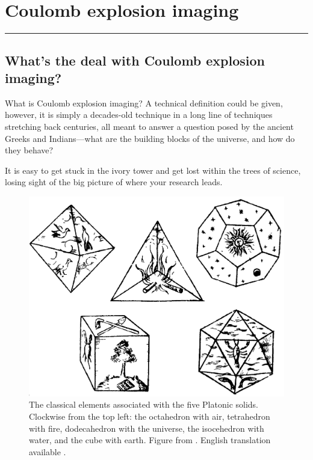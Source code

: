\chapter{Coulomb explosion imaging}\label{ch:CEI}

\vspace{-1.5 em}
\begin{addmargin}[-0.5cm]{0cm}
  \minitoc
\end{addmargin}
\hrule
\vspace{1.5 em}

\section{What's the deal with Coulomb explosion imaging?}
What is Coulomb explosion imaging? A technical definition could be given, however, it is simply a decades-old technique in a long line of techniques stretching back centuries, all meant to answer a question posed by the ancient Greeks and Indians---what are the building blocks of the universe, and how do they behave?

It is easy to get stuck in the ivory tower and get lost within the trees of science, losing sight of the big picture of where your research leads.


\pagebreak
\begin{figure}
  \centering
  \includegraphics[width=\textwidth]{gfx/PlatonicSolids}
  \caption[The classical elements associated with the five Platonic solids.]
  {The classical elements associated with the five Platonic solids. Clockwise from the top left: the octahedron with air, tetrahedron with fire, dodecahedron with the universe, the isocehedron with water, and the cube with earth. Figure from \citet[Book 2, p. 53]{Kepler1619}. English translation available \citep{Kepler97}.}
  \label{fig:platonicSolids}
\end{figure}
\clearpage

